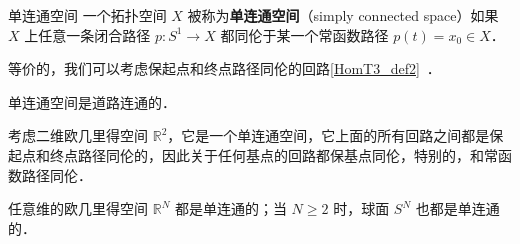 

\begin{definition}{单连通空间}\label{SmpCn_def1}
一个拓扑空间 $X$ 被称为\textbf{单连通空间}（simply connected space）如果 $X$ 上任意一条闭合路径 $p: S^1 \to X$ 都同伦于某一个常函数路径 $p(t) = x_0 \in X$．
\end{definition}

等价的，我们可以考虑保起点和终点路径同伦的回路\autoref{HomT3_def2}~．

\begin{theorem}{}
单连通空间是道路连通的．
\end{theorem}

\begin{example}{}
考虑二维欧几里得空间 $\mathbb{R}^2$，它是一个单连通空间，它上面的所有回路之间都是保起点和终点路径同伦的，因此关于任何基点的回路都保基点同伦，特别的，和常函数路径同伦．

任意维的欧几里得空间 $\mathbb{R}^N$ 都是单连通的；当 $N \geq 2$ 时，球面 $S^N$ 也都是单连通的．
\end{example}
